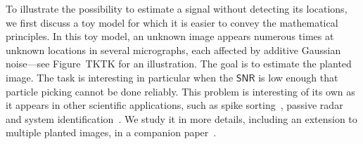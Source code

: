 \documentclass[english,11pt]{article}
\newcommand{\1}{\mathbf{1}}
\numberwithin{equation}{section}
\theoremstyle{plain}
\theoremstyle{definition}
\theoremstyle{remark}
\theoremstyle{plain}
\theoremstyle{remark}
\theoremstyle{plain}
\theoremstyle{plain}
\newcommand{\SNR}{\ensuremath{\textsf{SNR}}}
\begin{document}
To illustrate the possibility to estimate a signal without detecting its locations, we first discuss a toy model for which it is easier to convey the mathematical principles. 
In this toy model, an unknown image appears numerous times at unknown locations in several micrographs, each affected by additive Gaussian noise---see Figure~TKTK for an illustration.
The goal is to estimate the planted image. The task is interesting in particular when the $\SNR$ is low enough that particle picking cannot be done reliably. 
This problem is interesting of its own as it appears in other scientific applications, such as spike sorting~\cite{lewicki1998review}, passive radar~\cite{gogineni2017passive} and system identification~\cite{ljung1998system}. We study it in more details, including an extension to multiple planted images, in a companion paper~\cite{bendory2018estimation}.

%
\end{document}
